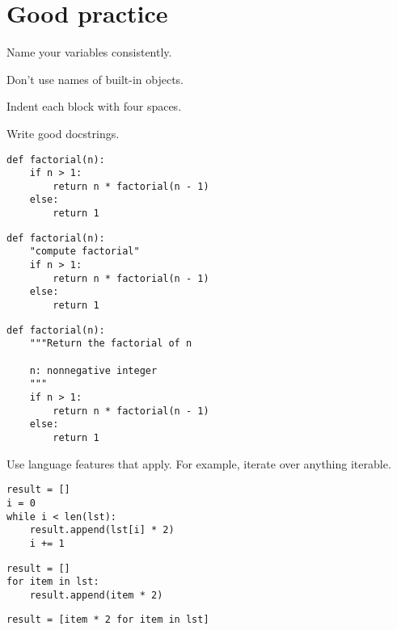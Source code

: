 \documentclass[10pt]{article}
\newenvironment{items}{\begin{itemize*}\setlength\itemsep{0pt}\setlength\parskip{0pt}\setlength\parsep{0pt}}{\end{itemize*}}
\begin{document}
\pagebreak
\section{Good practice}

\begin{items}
\item Name your variables consistently.
\item Don't use names of built-in objects.
\item Indent each block with four spaces.
\item Write good docstrings.
\begin{multicols}{3}\small
\colorbox{silver}{\hspace{0.8\columnwidth}}
\begin{verbatim}
def factorial(n):
    if n > 1:
        return n * factorial(n - 1)
    else:
        return 1
\end{verbatim}
\columnbreak
\colorbox{silver}{\hspace{0.8\columnwidth}}
\begin{verbatim}
def factorial(n):
    "compute factorial"
    if n > 1:
        return n * factorial(n - 1)
    else:
        return 1
\end{verbatim}
\columnbreak
\colorbox{silver}{\hspace{0.8\columnwidth}}
\begin{verbatim}
def factorial(n):
    """Return the factorial of n

    n: nonnegative integer
    """
    if n > 1:
        return n * factorial(n - 1)
    else:
        return 1
\end{verbatim}
\end{multicols}

\item Use language features that apply. For example, iterate over anything iterable.
\begin{multicols}{3}\small
\colorbox{silver}{\hspace{0.8\columnwidth}}
\begin{verbatim}
result = []
i = 0
while i < len(lst):
    result.append(lst[i] * 2)
    i += 1
\end{verbatim}
\columnbreak
\colorbox{silver}{\hspace{0.8\columnwidth}}
\begin{verbatim}
result = []
for item in lst:
    result.append(item * 2)
\end{verbatim}
\columnbreak
\colorbox{silver}{\hspace{0.8\columnwidth}}
\begin{verbatim}
result = [item * 2 for item in lst]
\end{verbatim}
\end{multicols}


\end{items}
\end{document}
